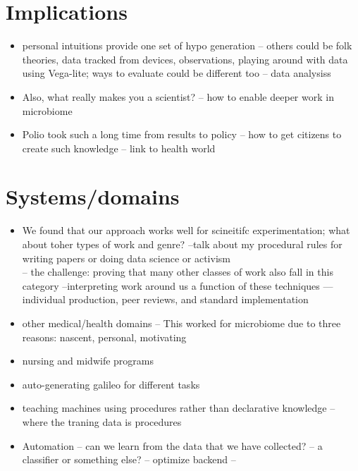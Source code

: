 \section{Implications}
\begin{itemize}
\item personal intuitions provide one set of hypo generation -- others could be folk theories, data tracked from devices, observations, playing around with data using Vega-lite; ways to evaluate could be different too -- data analysiss
\item Also, what really makes you a scientist? -- how to enable deeper work in microbiome
\item Polio took such a long time from results to policy --  how to get citizens to create such knowledge -- link to health world
\end{itemize}


\section{Systems/domains} 

\begin{itemize}
\item We found that our approach works well for scineitifc experimentation; what about toher types of work and genre?
--talk about my procedural rules for writing papers or doing data science or activism \\
-- the challenge: proving that many other classes of work also fall in this category
--interpreting work around us a function of these techniques — individual production, peer reviews, and standard implementation
\item other medical/health domains -- This worked for microbiome due to three reasons: nascent, personal, motivating 
\item nursing and midwife programs
\item auto-generating galileo for different tasks
\item teaching machines using procedures rather than declarative knowledge -- where the traning data is procedures
\item Automation -- can we learn from the data that we have collected? -- a classifier or something else? -- optimize backend -- 
\end{itemize}


